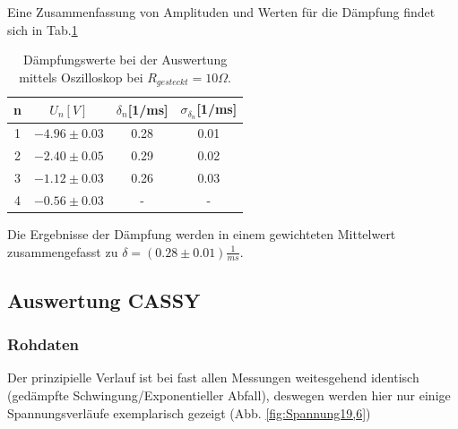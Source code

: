 \documentclass[12pt,a4paper]{article}
\begin{document}
Eine Zusammenfassung von Amplituden und Werten für die Dämpfung findet sich in Tab.\ref{tab:DämpfungOszi}
\begin{table}
\begin{center}
\begin{tabular}{|c|c|c|c|}
\hline
n & $U_n[V]$ & $\delta_n$[1/ms] & $\sigma_{\delta_n}$[1/ms]\\
\hline
1 & $-4.96 \pm 0.03$ & 0.28 & 0.01\\
\hline
2 & $-2.40 \pm 0.05$ & 0.29 & 0.02\\
\hline
3 & $-1.12 \pm 0.03$ & 0.26 & 0.03\\
\hline
4 & $-0.56 \pm 0.03$ & - & -\\
\hline
\end{tabular}
\end{center}
\caption{Dämpfungswerte bei der Auswertung mittels Oszilloskop bei $R_{gesteckt}=10 \Omega$.}
\label{tab:DämpfungOszi}
\end{table}

Die Ergebnisse der Dämpfung werden in einem gewichteten Mittelwert zusammengefasst zu $\delta=(0.28 \pm 0.01)\frac{1}{ms}$.



\subsection{Auswertung CASSY}
\subsubsection{Rohdaten}
Der prinzipielle Verlauf ist bei fast allen Messungen weitesgehend identisch (gedämpfte Schwingung/Exponentieller Abfall), deswegen werden hier nur einige Spannungsverläufe exemplarisch gezeigt (Abb. \ref{fig:Spannung19,6})
\end{document}
